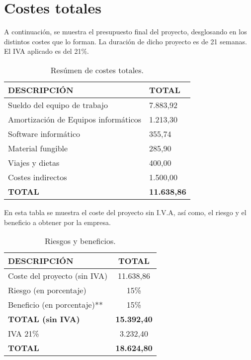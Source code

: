 \newpage
\section{Costes totales}
\par A continuación, se muestra el presupuesto final del proyecto, desglosando en los distintos costes que lo forman. La duración de dicho proyecto es de 21 semanas. El IVA aplicado es del 21\%.

\begin{table}[H]
\begin{center}
\begin{tabular}{l l}
\textbf{DESCRIPCIÓN} & \textbf{TOTAL}\\ \hline \hline
Sueldo del equipo de trabajo & 7.883,92\\
Amortización de Equipos informáticos & 1.213,30\\
Software informático & 355,74\\
Material fungible & 285,90\\
Viajes y dietas & 400,00\\
Costes indirectos & 1.500,00\\ \hline \hline
\textbf{TOTAL} & \textbf{11.638,86}\\ \hline
\end{tabular}
\caption{Resúmen de costes totales.}
\label{tab:resumenTotal}
\end{center}
\end{table}

En esta tabla se muestra el coste del proyecto sin I.V.A, así como, el riesgo y el beneficio a obtener por la empresa.
\begin{table}[H]
\begin{center}
\begin{tabular}{l c}
\textbf{DESCRIPCIÓN} & \textbf{TOTAL}\\ \hline \hline
Coste del proyecto (sin IVA) &  11.638,86\\
Riesgo (en porcentaje) & 15\% \\
Beneficio (en porcentaje)** & 15\% \\ \hline \hline
\textbf{TOTAL (sin IVA)} & \textbf{15.392,40}\\ \hline \hline
IVA 21\% & 3.232,40 \\\hline \hline
\textbf{TOTAL} &  \textbf{18.624,80}\\ \hline
\end{tabular}
\caption{Riesgos y beneficios.}
\label{tab:total}
\end{center}
\end{table}
